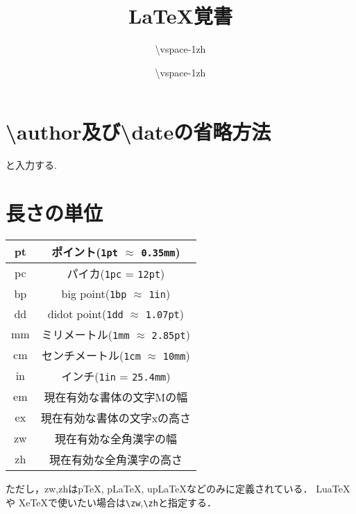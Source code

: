 \documentclass[12pt,uplatex]{jsarticle}
\title{\LaTeX 覚書}
\author{\vspace{-1zh}}\date{\vspace{-1zh}}
\begin{document}
  \maketitle
  \tableofcontents
  \clearpage

  \section{\textbackslash author及び\textbackslash dateの省略方法}

  \begin{excode}
      \author{\textbackslash vspace{-1zh}}
      \date{\textbackslash vspace{-1zh}}
  \end{excode}
  と入力する.

  \section{長さの単位}

  \begin{table}[H]
  	\centering

  	\begin{tabular}{|c|c|} \hline
  		pt & ポイント(\verb|1pt| $\approx$ \verb|0.35mm|) \\ \hline
  		pc & パイカ(\verb|1pc| = \verb|12pt|) \\ \hline
  		bp & big point(\verb|1bp| $\approx$ \verb|1in|) \\ \hline
  		dd & didot point(\verb|1dd| $\approx$ \verb|1.07pt|) \\ \hline
  		mm & ミリメートル(\verb|1mm| $\approx$ \verb|2.85pt|) \\ \hline
  		cm & センチメートル(\verb|1cm| $\approx$ \verb|10mm|) \\ \hline
  		in & インチ(\verb|1in| = \verb|25.4mm|) \\ \hline
  		em & 現在有効な書体の文字Mの幅 \\ \hline
  		ex & 現在有効な書体の文字xの高さ \\ \hline
  		zw & 現在有効な全角漢字の幅 \\ \hline
  		zh & 現在有効な全角漢字の高さ \\ \hline
  	\end{tabular}
  \end{table}
  ただし，zw,zhはp\TeX , p\LaTeX , up\LaTeX などのみに定義されている．
  Lua\TeX や Xe\TeX で使いたい場合は\verb|\zw|,\verb|\zh|と指定する．
\end{document}

